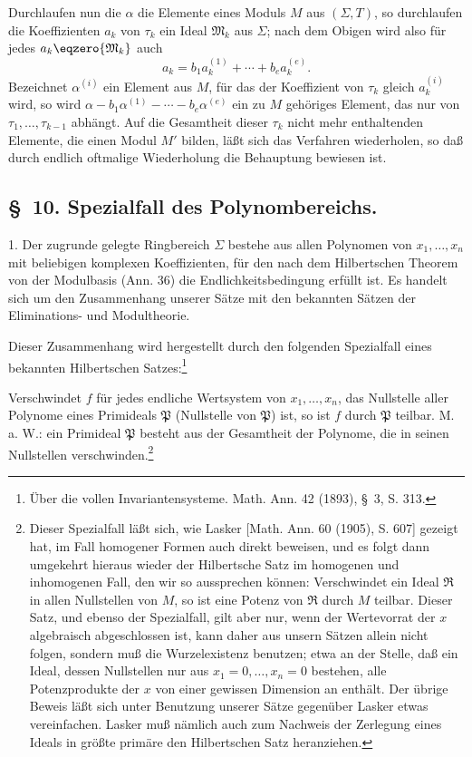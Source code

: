 \documentclass[11pt]{article}
\newcommand{\ideal}[1]{\mathfrak{#1}}
\begin{document}
Durchlaufen nun die $\alpha$ die Elemente eines Moduls $M$ aus $(\Sigma,T)$, so durchlaufen die Koeffizienten $a_k$ von $\tau_k$ ein Ideal $\ideal M_k$ aus $\Sigma$; nach dem Obigen wird also für jedes $a_k\eqzero{\ideal M_k}$ auch
\[
 a_k=b_1a_k^{(1)}+\cdots+b_ea_k^{(e)}.
\]
Bezeichnet $\alpha^{(i)}$ ein Element aus $M$, für das der Koeffizient von $\tau_k$ gleich $a_k^{(i)}$ wird, so wird $\alpha-b_1\alpha^{(1)}-\cdots-b_e\alpha^{(e)}$ ein zu $M$ gehöriges Element, das nur von $\tau_1,
\ldots,\tau_{k-1}$ abhängt. Auf die Gesamtheit dieser $\tau_k$ nicht mehr enthaltenden Elemente, die einen Modul $M'$ bilden, läßt sich das Verfahren wiederholen, so daß durch endlich oftmalige Wiederholung die Behauptung bewiesen ist.

\subsection*{\S~10. Spezialfall des Polynombereichs.}

1. Der zugrunde gelegte Ringbereich $\Sigma$ bestehe aus allen Polynomen von $x_1,
\ldots,x_n$ mit beliebigen komplexen Koeffizienten, für den nach dem Hilbertschen Theorem von der Modulbasis (Ann. 36) die Endlichkeitsbedingung erfüllt ist. Es handelt sich um den Zusammenhang unserer Sätze mit den bekannten Sätzen der Eliminations- und Modultheorie.

Dieser Zusammenhang wird hergestellt durch den folgenden Spezialfall eines bekannten Hilbertschen Satzes:\footnote{Über die vollen Invariantensysteme. Math. Ann. 42 (1893), \S~3, S. 313.}

Verschwindet $f$ für jedes endliche Wertsystem von $x_1,
\ldots,x_n$, das Nullstelle aller Polynome eines Primideals $\ideal P$ (Nullstelle von $\ideal P$) ist, so ist $f$ durch $\ideal P$ teilbar. M. a. W.: ein Primideal $\ideal P$ besteht aus der Gesamtheit der Polynome, die in seinen Nullstellen verschwinden.\footnote{Dieser Spezialfall läßt sich, wie Lasker [Math. Ann. 60 (1905), S. 607] gezeigt hat, im Fall homogener Formen auch direkt beweisen, und es folgt dann umgekehrt hieraus wieder der Hilbertsche Satz im homogenen und inhomogenen Fall, den wir so aussprechen können: Verschwindet ein Ideal $\ideal R$ in allen Nullstellen von $M$, so ist eine Potenz von $\ideal R$ durch $M$ teilbar. Dieser Satz, und ebenso der Spezialfall, gilt aber nur, wenn der Wertevorrat der $x$ algebraisch abgeschlossen ist, kann daher aus unsern Sätzen allein nicht folgen, sondern muß die Wurzelexistenz benutzen; etwa an der Stelle, daß ein Ideal, dessen Nullstellen nur aus $x_1=0,
\ldots,x_n=0$ bestehen, alle Potenzprodukte der $x$ von einer gewissen Dimension an enthält. Der übrige Beweis läßt sich unter Benutzung unserer Sätze gegenüber Lasker etwas vereinfachen. Lasker muß nämlich auch zum Nachweis der Zerlegung eines Ideals in größte primäre den Hilbertschen Satz heranziehen.}
\end{document}
